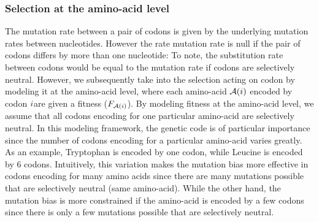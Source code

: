 \subsubsection{Selection at the amino-acid level}
\label{sec-mut-bias:aa-selection}
The mutation rate between a pair of \glspl{codon} is given by the underlying mutation rates between nucleotides.
However the rate mutation rate is null if the pair of \glspl{codon} differs by more than one nucleotide:
To note, the \gls{substitution} rate between \glspl{codon} would be equal to the mutation rate if \glspl{codon} are selectively \gls{neutral}.
However, we subsequently take into the selection acting on \gls{codon} by modeling it at the amino-acid level, where each amino-acid $\mathcal{A}({i})$ encoded by \gls{codon} ${i} $are given a fitness ($F_{\mathcal{A}({i})}$).
By modeling fitness at the amino-acid level, we assume that all \glspl{codon} encoding for one particular amino-acid are selectively \gls{neutral}.
In this modeling framework, the genetic code is of particular importance since the number of \glspl{codon} encoding for a particular amino-acid varies greatly.
As an example, Tryptophan is encoded by one \gls{codon}, while Leucine is encoded by 6 \glspl{codon}.
Intuitively, this variation makes the mutation bias more effective in \glspl{codon} encoding for many amino acids since there are many mutations possible that are selectively \gls{neutral} (same amino-acid).
While the other hand, the mutation bias is more constrained if the amino-acid is encoded by a few \glspl{codon} since there is only a few mutations possible that are selectively \gls{neutral}.\\

